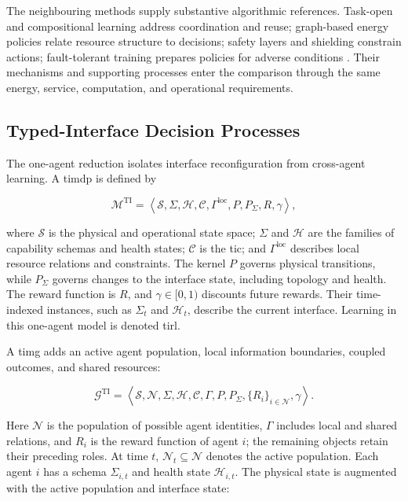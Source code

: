 The neighbouring methods supply substantive algorithmic references. Task-open and compositional learning address coordination and reuse; graph-based energy policies relate resource structure to decisions; safety layers and shielding constrain actions; fault-tolerant training prepares policies for adverse conditions \parencite{anil2025mohito,luketina2025compositional,orfanoudakis2026gnndt,dalal2018safe,mguni2025faulttolerant}. Their mechanisms and supporting processes enter the comparison through the same energy, service, computation, and operational requirements.

\subsection{Typed-Interface Decision Processes}
\label{sec:timarl-decision-processes}

The one-agent reduction isolates interface reconfiguration from cross-agent learning. A \gls{timdp} is defined by

\begin{equation}
\mathcal{M}^{\mathrm{TI}} =
\left\langle
\mathcal{S},\Sigma,\mathcal{H},\mathcal{C},\Gamma^{\mathrm{loc}},P,P_{\Sigma},R,\gamma
\right\rangle,
\label{eq:timdp-tuple}
\end{equation}

where $\mathcal{S}$ is the physical and operational state space; $\Sigma$ and $\mathcal{H}$ are the families of capability schemas and health states; $\mathcal{C}$ is the \gls{tic}; and $\Gamma^{\mathrm{loc}}$ describes local resource relations and constraints. The kernel $P$ governs physical transitions, while $P_{\Sigma}$ governs changes to the interface state, including topology and health. The reward function is $R$, and $\gamma\in[0,1)$ discounts future rewards. Their time-indexed instances, such as $\Sigma_t$ and $\mathcal{H}_t$, describe the current interface. Learning in this one-agent model is denoted \gls{tirl}.

A \gls{timg} adds an active agent population, local information boundaries, coupled outcomes, and shared resources:

\begin{equation}
\mathcal{G}^{\mathrm{TI}} =
\left\langle
\mathcal{S},\mathcal{N},\Sigma,\mathcal{H},\mathcal{C},\Gamma,P,P_{\Sigma},\{R_i\}_{i\in\mathcal{N}},\gamma
\right\rangle.
\label{eq:timg-tuple}
\end{equation}

Here $\mathcal{N}$ is the population of possible agent identities, $\Gamma$ includes local and shared relations, and $R_i$ is the reward function of agent $i$; the remaining objects retain their preceding roles. At time $t$, $\mathcal{N}_t\subseteq\mathcal{N}$ denotes the active population. Each agent $i$ has a schema $\Sigma_{i,t}$ and health state $\mathcal{H}_{i,t}$. The physical state is augmented with the active population and interface state:


